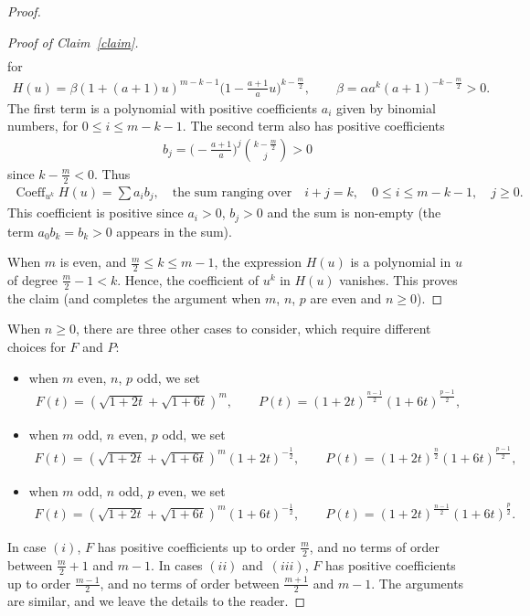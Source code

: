 \documentclass[10pt,a4paper]{amsart}
\numberwithin{equation}{section}
\begin{document}
\begin{proof}
\begin{proof}[Proof of Claim~\ref{claim}]
\begin{gather*}
\end{gather*}
for
\begin{gather*}
H(u)=\beta (1+(a+1)u)^{m-k-1} \biggl(1-\frac{a+1}{a}u\biggr)^{k-\frac{m}{2}}, \qquad \beta=\alpha a^{k} (a+1)^{-k-\frac{m}{2}}>0.
\end{gather*}
The first term is a polynomial with positive coefficients $a_i$ given by binomial numbers, for $0\leq i\leq m-k-1$. The second term also has positive coefficients
\begin{gather*}
b_j=\biggl(-\frac{a+1}{a}\biggr)^j\binom{k-\frac{m}{2}}{j}>0
\end{gather*}
since $k-\frac{m}{2}<0$. Thus
\begin{gather*}
\operatorname{Coeff}_{u^k} H(u)=\!\sum a_i b_j,\quad \text{the sum ranging over}\!\quad i+j=k, \quad 0\leq i\leq m-k-1, \quad j\geq 0.
\end{gather*}
This coefficient is positive since $a_i>0$, $b_j> 0$ and the sum is non-empty (the term $a_0b_k=b_k>0$ appears in the sum).

When $m$ is even, and $\frac{m}{2}\leq k\leq m-1$, the expression $H(u)$ is a polynomial in $u$ of degree $\frac{m}{2}-1<k$. Hence, the coefficient of $u^k$ in $H(u)$ vanishes.
This proves the claim (and completes the argument when $m$, $n$, $p$ are even and $n\geq 0$).
\end{proof}

When $n\geq 0$, there are three other cases to consider, which require different choices for $F$ and $P$:
\begin{itemize}\itemsep=0pt
\item [$(i)$] when $m$ even, $n$, $p$ odd, we set
\begin{gather*}
F(t)=\left(\sqrt{1+2t}+\sqrt{1+6t}\right)^m, \qquad
P(t)=(1+2t)^{\frac{n-1}{2}} (1+6t)^{\frac{p-1}{2}},
\end{gather*}
\item [$(ii)$] when $m$ odd, $n$ even, $p$ odd, we set
\begin{gather*}
F(t)=\left(\sqrt{1+2t}+\sqrt{1+6t}\right)^m {(1+2t)}^{-\frac{1}{2}}, \qquad
P(t)=(1+2t)^{\frac{n}{2}} (1+6t)^{\frac{p-1}{2}},
\end{gather*}
\item [$(iii)$] when $m$ odd, $n$ odd, $p$ even, we set
\begin{gather*}
F(t)=\left(\sqrt{1+2t}+\sqrt{1+6t}\right)^m (1+6t)^{-\frac{1}{2}}, \qquad
P(t)=(1+2t)^{\frac{n-1}{2}} (1+6t)^{\frac{p}{2}}.
\end{gather*}
\end{itemize}
In case $(i)$, $F$ has positive coefficients up to order $\frac{m}{2}$, and no terms of order between $\frac{m}{2}+1$ and $m-1$.
In cases $(ii)$ and~$(iii)$, $F$ has positive coefficients up to order $\frac{m-1}{2}$, and no terms of order between $\frac{m+1}{2}$ and $m-1$. The arguments are similar, and we leave the details to the reader.


\end{proof}
\end{document}
